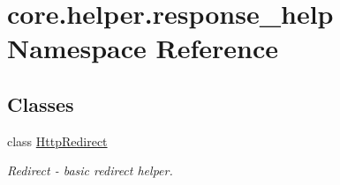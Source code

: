 \hypertarget{namespacecore_1_1helper_1_1response__help}{\section{core.\-helper.\-response\-\_\-help Namespace Reference}
\label{namespacecore_1_1helper_1_1response__help}
}
\subsection*{Classes}
\begin{DoxyCompactItemize}
\item 
class \hyperlink{classcore_1_1helper_1_1response__help_1_1HttpRedirect}{Http\-Redirect}
\begin{DoxyCompactList}\small\item\em Redirect -\/ basic redirect helper. \end{DoxyCompactList}\end{DoxyCompactItemize}

